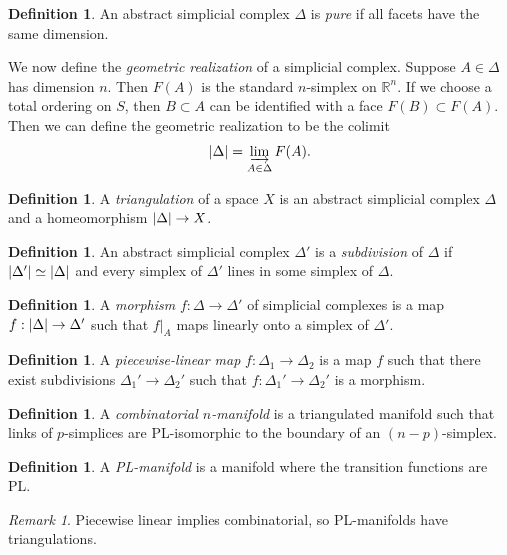 \documentclass[leqno, openany]{memoir}
\theoremstyle{definition}
\newtheorem{defn}[thm]{Definition}
\theoremstyle{remark}
\newtheorem{rmk}[thm]{Remark}
\theoremstyle{plain}
\theoremstyle{definition}
\theoremstyle{remark}
\newcommand{\R}{\mathbb{R}}
\begin{document}
\begin{defn}
    An abstract simplicial complex $\Delta$ is \textit{pure} if all facets have the same dimension.
\end{defn}

We now define the \textit{geometric realization} of a simplicial complex. Suppose $A \in \Delta$ has dimension $n$. Then $F(A)$ is the standard $n$-simplex on $\R^n$. If we choose a total ordering on $S$, then $B \subset A$ can be identified with a face $F(B) \subset F(A)$. Then we can define the geometric realization to be the colimit
\[ \abs{\Delta} = \varinjlim_{A \in \Delta} F(A). \]

\begin{defn}
    A \textit{triangulation} of a space $X$ is an abstract simplicial complex $\Delta$ and a homeomorphism $\abs{\Delta} \to X$.
\end{defn}

\begin{defn}
    An abstract simplicial complex $\Delta'$ is a \textit{subdivision} of $\Delta$ if $\abs{\Delta'} \simeq \abs{\Delta}$ and every simplex of $\Delta'$ lines in some simplex of $\Delta$.
\end{defn}

\begin{defn}
    A \textit{morphism} $f: \Delta \to \Delta'$ of simplicial complexes is a map $f: \abs{\Delta} \to \Delta'$ such that $f|_A$ maps linearly onto a simplex of $\Delta'$.
\end{defn}

\begin{defn}
    A \textit{piecewise-linear map} $f: \Delta_1 \to \Delta_2$ is a map $f$ such that there exist subdivisions $\Delta_1' \to \Delta_2'$ such that $f: \Delta_1' \to \Delta_2'$ is a morphism.
\end{defn}

\begin{defn}
    A \textit{combinatorial $n$-manifold} is a triangulated manifold such that links of $p$-simplices are PL-isomorphic to the boundary of an $(n-p)$-simplex.
\end{defn}

\begin{defn}
    A \textit{PL-manifold} is a manifold where the transition functions are PL.
\end{defn}

\begin{rmk}
    Piecewise linear implies combinatorial, so PL-manifolds have triangulations.
\end{rmk}
\end{document}
